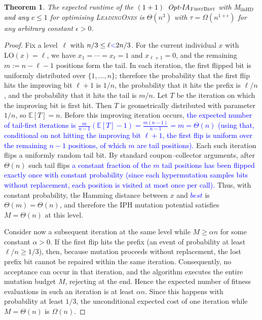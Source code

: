 \documentclass[lettersize,journal]{IEEEtran}
\newcommand{\new}[1]{\textcolor{black}{#1}}
\newcommand{\linHD}{M$_{\text{linHD}}$}
\newtheorem{theorem}{Theorem}
\begin{document}
\begin{theorem}\label{thm:FBleadingones}
The expected runtime of the \new{$(1+1)$~Opt-IA$_{\textsc{FirstBest}}$}  with {\linHD } \new{and any $c\leq 1$} for optimising
\textsc{LeadingOnes} is $\Theta(n^3)$ with $\tau=\Omega(n^{1+\epsilon})$ for any arbitrary
constant $\epsilon>0$.
\end{theorem}
\begin{proof}

Fix a level~$\ell$ with $n/3\le \ell \textcolor{blue}{<} 2n/3$. For the current individual $x$ with $\mathrm{LO}(x)=\ell$, we have $x_1=\cdots=x_{\ell}=1$ and $x_{\ell+1}=0$, and the remaining $m:=n-\ell-1$ positions form the tail. In each iteration, the first flipped bit is uniformly distributed over $\{1,\dots,n\}$; therefore the probability that the first flip hits the improving bit $\ell+1$ is $1/n$, the probability that it hits the prefix is $\ell/n$, and the probability that it hits the tail is $m/n$. Let $T$ be the iteration on which the improving bit is first hit. Then $T$ is geometrically distributed with parameter~$1/n$, so $\mathbb{E}[T]=n$. Before this improving iteration occurs, \textcolor{blue}{the expected number of tail-first iterations is
$\frac{m}{n-1}(\mathbb{E}[T]-1) = \frac{m(n-1)}{n-1} = m = \Theta(n)$
(using that, conditional on not hitting the improving bit $\ell+1$, the
first flip is uniform over the remaining $n-1$ positions, of which $m$
are tail positions).} Each such iteration flips a uniformly random tail bit. By standard coupon--collector arguments, after $\Theta(n)$ such tail flips \textcolor{blue}{a constant fraction of the $m$ tail positions has been flipped exactly once
with constant probability (since each hypermutation samples bits without
replacement, each position is visited at most once per call).} Thus, with constant probability, the Hamming distance between $x$ and \textcolor{blue}{$\mathit{best}$} is $\Theta(m)=\Theta(n)$, and therefore the IPH mutation potential satisfies $M=\Theta(n)$ at this level.

Consider now a subsequent iteration at the same level while $M\ge \alpha n$ for some constant $\alpha>0$. If the first flip hits the prefix (an event of probability at least $\ell/n\ge 1/3$), then, because mutation proceeds without replacement, the lost prefix bit cannot be repaired within the same iteration. Consequently, no acceptance can occur in that iteration, and the algorithm executes the entire mutation budget $M$, rejecting at the end. Hence the expected number of fitness evaluations in such an iteration is at least $\alpha n$. Since this happens with probability at least $1/3$, the unconditional expected cost of one iteration while $M=\Theta(n)$ is $\Omega(n)$.


\end{proof}
\end{document}

